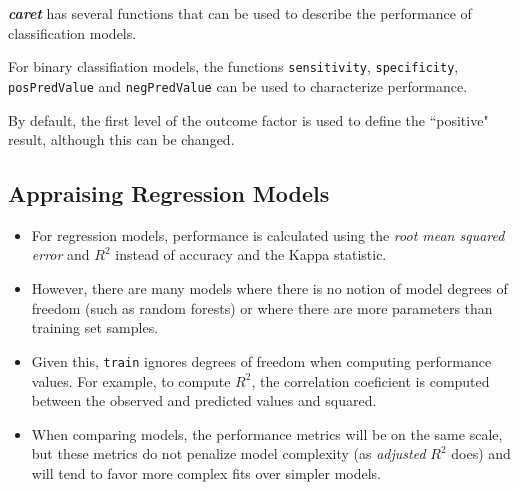 \documentclass[11pt]{article} %
\begin{document}
\textbf{\textit{caret}} has several functions that can be used to describe the performance of classification models.


 For binary classifiation models, the functions \texttt{sensitivity}, \texttt{specificity},
\texttt{posPredValue} and \texttt{negPredValue} can be used to characterize performance.

By default, the first level of the outcome factor is used to define the ``positive"
result, although this can be changed.




\newpage
\subsection{Appraising Regression Models}
\begin{itemize}
\item For regression models, performance is calculated using the \textit{root
mean squared error} and $R^2$ instead of accuracy and the Kappa statistic. 

\item However, there are
many models where there is no notion of model degrees of freedom (such as random forests)
or where there are more parameters than training set samples. 

\item Given this, \texttt{train} ignores
degrees of freedom when computing performance values. For example, to compute $R^2$, the
correlation coeficient is computed between the observed and predicted values and squared.

\item When comparing models, the performance metrics will be on the same scale, but these metrics
do not penalize model complexity (as \textit{adjusted} $R^2$ does) and will tend to favor more complex
fits over simpler models.
\end{itemize}


\end{document}
